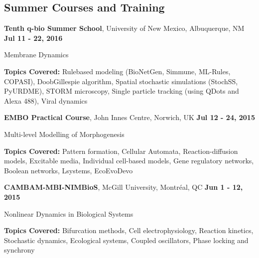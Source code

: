 \documentclass[margin,line]{res}
\newenvironment{list1}{
  \begin{list}{\ding{113}}{
      \setlength{\itemsep}{0in}
      \setlength{\parsep}{0in} \setlength{\parskip}{0in}
      \setlength{\topsep}{0in} \setlength{\partopsep}{0in} 
      \setlength{\leftmargin}{0.17in}}}{\end{list}}
\begin{document}
\begin{resume}
\vspace*{.4cm}

\section{\sc Summer Courses and Training}

{\bf Tenth q-bio Summer School}, University of New Mexico, Albuquerque, NM  \hfill {\bf Jul 11 - 22, 2016}\\
\vspace*{-.2cm}
\begin{list1}
\item[] Membrane Dynamics
\vspace*{0.2cm}
\item[] {\bf Topics Covered:} Rule{\textendash}based modeling (BioNetGen, Simmune, ML-Rules, COPASI), Doob{\textendash}Gillespie algorithm, Spatial stochastic simulations (StochSS, PyURDME), STORM microscopy, Single particle tracking (using Q{\textendash}Dots and Alexa 488), Viral dynamics
\end{list1}

{\bf EMBO Practical Course}, John Innes Centre, Norwich, UK  \hfill {\bf Jul 12 - 24, 2015}\\
\vspace*{-.2cm}
\begin{list1}
\item[] Multi-level Modelling of Morphogenesis
\vspace*{0.2cm}
\item[] {\bf Topics Covered:} Pattern formation, Cellular Automata, Reaction-diffusion models, Excitable media, Individual cell-based models, Gene regulatory networks, Boolean networks, L{\textendash}systems, Eco{\textendash}Evo{\textendash}Devo
\end{list1}

{\bf CAMBAM-MBI-NIMBioS}, McGill University, Montr\'eal, QC \hfill {\bf Jun 1 - 12, 2015}\\
\vspace*{-.2cm}
\begin{list1}
\item[] Nonlinear Dynamics in Biological Systems
\vspace*{0.2cm}
\item[] {\bf Topics Covered:} Bifurcation methods, Cell electrophysiology, Reaction kinetics, Stochastic dynamics, Ecological systems, Coupled oscillators, Phase locking and synchrony
\end{list1}


\end{resume}
\end{document}
